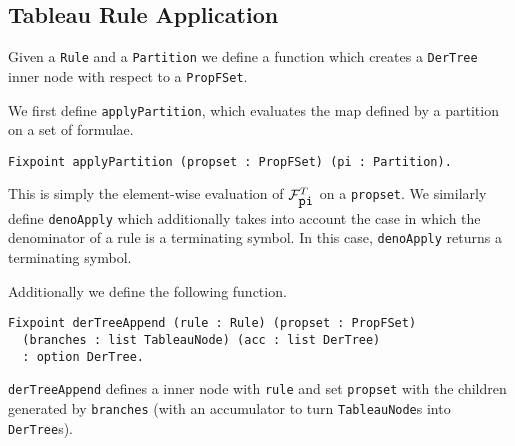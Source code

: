 \documentclass{llncs}
\newcommand{\comment}[1]{}
\begin{document}
\subsection{Tableau Rule Application}
%
Given a \verb+Rule+ and a \verb+Partition+ we define a function which
creates a \verb+DerTree+ inner node with respect to a \verb+PropFSet+.

We first define \verb+applyPartition+, which evaluates the map defined by a
partition on a set of formulae.
%
\begin{verbatim}
Fixpoint applyPartition (propset : PropFSet) (pi : Partition).
\end{verbatim}
%
This is simply the element-wise evaluation of $\mathcal{F}_{\verb+pi+}^{T}$ on
a \verb+propset+. We similarly define \verb+denoApply+ which additionally takes
into account the case in which the denominator of a rule is a terminating
symbol. In this case, \verb+denoApply+ returns a terminating symbol.
\comment{
We also define the notion of set subtraction in Coq, \verb+removeMultSet+.
%
\begin{verbatim}
Fixpoint removeMultSet (remove setprop : PropFSet) : PropFSet.
\end{verbatim}
%
This function simply returns a \verb+PropFSet+ which is the set \verb+setprop+
subtracted by the set \verb+remove+.
}

Additionally we define the following function.
%
\begin{verbatim}
Fixpoint derTreeAppend (rule : Rule) (propset : PropFSet)
  (branches : list TableauNode) (acc : list DerTree)
  : option DerTree.
\end{verbatim}
%
\verb+derTreeAppend+ defines a inner node with \verb+rule+ and set
\verb+propset+ with the children generated by \verb+branches+ (with an
accumulator to turn \verb+TableauNode+s into \verb+DerTree+s).
\end{document}
